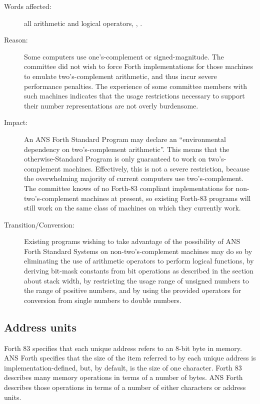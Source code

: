 \begin{description}
\item[Words affected:]
	all arithmetic and logical operators,
	,
	.

\item[Reason:]
	Some computers use one's-complement or signed-magnitude. The
	committee did not wish to force Forth implementations for those
	machines to emulate two's-complement arithmetic, and thus incur
	severe performance penalties. The experience of some committee
	members with such machines indicates that the usage restrictions
	necessary to support their number representations are not overly
	burdensome.

\item[Impact:]
	An ANS Forth Standard Program may declare an ``environmental
	dependency on two's-com\-ple\-ment arithmetic''. This means that the
	otherwise-Standard Program is only guaranteed to work on
	two's-complement machines. Effectively, this is not a severe
	restriction, because the overwhelming majority of current
	computers use two's-complement. The committee knows of no Forth-83
	com\-pli\-ant implementations for non-two's-complement machines at
	present, so existing Forth-83 programs will still work on the same
	class of machines on which they currently work.

\item[Transition/Conversion:]
	Existing programs wishing to take advantage of the possibility of
	ANS Forth Standard Systems on non-two's-complement machines may
	do so by eliminating the use of a\-rith\-me\-tic operators to perform
	logical functions, by deriving bit-mask constants from bit
	operations as described in the section about stack width, by
	restricting the usage range of unsigned numbers to the range of
	positive numbers, and by using the provided operators for
	conversion from single numbers to double numbers.
\end{description}

\subsection{Address units} %

Forth 83 specifies that each unique address refers to an 8-bit byte
in memory. ANS Forth specifies that the size of the item referred to
by each unique address is implementation-defined, but, by default,
is the size of one character. Forth 83 describes many memory
operations in terms of a number of bytes. ANS Forth describes those
operations in terms of a number of either characters or address
units.

